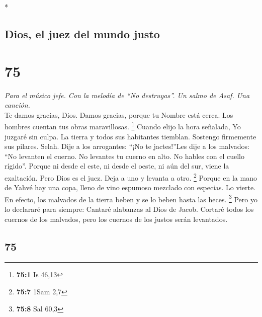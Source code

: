\begin{paracol}{2}
\begin{otherlanguage}{english}
\end{otherlanguage}

\switchcolumn[0]*

\hypertarget{dios-el-juez-del-mundo-justo}{%
\subsection{Dios, el juez del mundo
justo}\label{dios-el-juez-del-mundo-justo}}

\hypertarget{section-148}{%
\section{75}\label{section-148}}

\emph{Para el músico jefe. Con la melodía de ``No destruyas''. Un salmo
de Asaf. Una canción.}\\
 Te damos gracias, Dios. Damos gracias, porque tu Nombre
está cerca. Los hombres cuentan tus obras maravillosas. \footnote{\textbf{75:1}
  Is 46,13}  Cuando elijo la hora señalada, Yo juzgaré sin
culpa.  La tierra y todos sus habitantes tiemblan.
Sostengo firmemente sus pilares. Selah.  Dije a los
arrogantes: ``¡No te jactes!''Les dije a los malvados: ``No levanten el
cuerno.  No levantes tu cuerno en alto. No hables con el
cuello rígido''.  Porque ni desde el este, ni desde el
oeste, ni aún del sur, viene la exaltación.  Pero Dios es
el juez. Deja a uno y levanta a otro. \footnote{\textbf{75:7} 1Sam 2,7}
 Porque en la mano de Yahvé hay una copa, lleno de vino
espumoso mezclado con especias. Lo vierte. En efecto, los malvados de la
tierra beben y se lo beben hasta las heces. \footnote{\textbf{75:8} Sal
  60,3}  Pero yo lo declararé para siempre: Cantaré
alabanzas al Dios de Jacob.  Cortaré todos los cuernos de
los malvados, pero los cuernos de los justos serán levantados.

\switchcolumn
\begin{otherlanguage}{english}

\hypertarget{section-149}{%
\section{75}\label{section-149}}


\end{otherlanguage}
\end{paracol}
